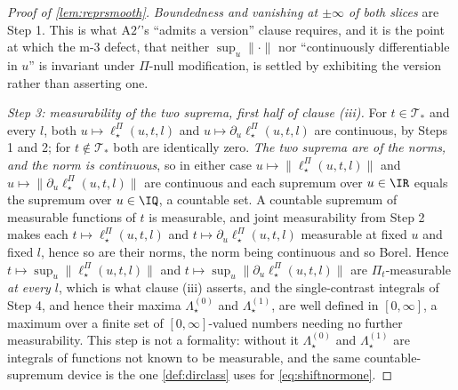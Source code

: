 \begin{proof}[Proof of \cref{lem:reprsmooth}]
\emph{Boundedness and vanishing at $\pm\infty$ of both slices} are Step 1. This is what A$2'$'s
``admits a version'' clause requires, and it is the point at which the m-3 defect, that neither
$\sup_u\|\cdot\|$ nor ``continuously differentiable in $u$'' is invariant under $\Pi$-null modification, 
is settled by exhibiting the version rather than asserting one.

\emph{Step 3: measurability of the two suprema, first half of clause \textup{(iii)}.} For
$t\in\mathcal T_\ast$ and every $l$, both $u\mapsto\ell^\Pi_\star(u,t,l)$ and
$u\mapsto\partial_u\ell^\Pi_\star(u,t,l)$ are
continuous, by Steps 1 and 2; for $t\notin\mathcal T_\ast$ both are identically zero. \emph{The two suprema
are of the norms, and the norm is continuous}, so in either case $u\mapsto\|\ell^\Pi_\star(u,t,l)\|$ and
$u\mapsto\|\partial_u\ell^\Pi_\star(u,t,l)\|$ are continuous and
each supremum over $u\in\IR$ equals the supremum over $u\in\IQ$, a countable set. A countable
supremum of measurable functions of $t$ is measurable, and joint measurability from Step 2 makes each
$t\mapsto\ell^\Pi_\star(u,t,l)$ and $t\mapsto\partial_u\ell^\Pi_\star(u,t,l)$ measurable at fixed $u$ and
fixed $l$, hence
so are their norms, the norm being continuous and so Borel. Hence
$t\mapsto\sup_u\|\ell^\Pi_\star(u,t,l)\|$ and $t\mapsto\sup_u\|\partial_u\ell^\Pi_\star(u,t,l)\|$ are
$\Pi_t$-measurable \emph{at every $l$}, which is what clause \textup{(iii)} asserts, and the
single-contrast integrals of Step 4, and hence their maxima $\Lambda^{(0)}_\star$ and
$\Lambda^{(1)}_\star$, are well defined in $[0,\infty]$, a maximum over a finite set of
$[0,\infty]$-valued numbers needing no further measurability. This step is not a formality: without it
$\Lambda^{(0)}_\star$ and $\Lambda^{(1)}_\star$ are integrals of functions not known to be measurable,
and the same countable-supremum device is the one \cref{def:dirclass} uses for \eqref{eq:shiftnormone}.


\end{proof}
